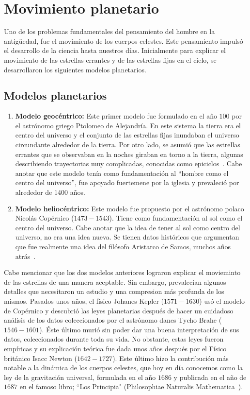\section{Movimiento planetario}

Uno de los problemas fundamentales del pensamiento del hombre en la antigüedad, fue el movimiento de los cuerpos celestes. Este pensamiento impulsó el desarrollo de la ciencia hasta nuestros días. Inicialmente para explicar el movimiento de las estrellas errantes y de las estrellas fijas en el cielo, se desarrollaron los siguientes modelos planetarios. 

\subsection{Modelos planetarios}

\begin{enumerate}
\item \textbf{Modelo geocéntrico:} Este primer modelo fue formulado en el año $100$ por el astrónomo griego Ptolomeo de Alejandría. En este sistema la tierra era el centro del universo y el conjunto de las estrellas fijas inundaban el universo circundante alrededor de la tierra. Por otro lado, se asumió que las estrellas errantes que se observaban en la noches giraban en torno a la tierra, algunas describiendo trayectorias muy complicadas, conocidas como epiciclos~\cite{alonso-z}. Cabe anotar que este modelo tenía como fundamentación al ``hombre como el centro del universo'', fue apoyado fuertemene por la iglesia y prevaleció por alrededor de 1400 años.

\item \textbf{Modelo heliocéntrico:} Este modelo fue propuesto por el astrónomo polaco Nicolás Copérnico ($1473-1543$). Tiene como fundamentación al sol como el centro del universo.
Cabe anotar que la idea de tener al sol como centro del universo, no era una idea nueva. Se tienen datos históricos que argumentan que fue realmente una idea del filósofo Aristarco de Samos, muchos años atrás~\cite{alonso-z}.
\end{enumerate}

Cabe mencionar que los dos modelos anteriores lograron explicar el movieminto de las estrellas de una manera aceptable. Sin embargo, prevalecian algunos detalles que necesitaron un estudio y una compresion más profunda de los mismos. Pasados unos años, el físico Johanes Kepler ($1571-1630$) usó el modelo de Copérnico y descubrió las leyes planetarias después de hacer un cuidadoso análisis de los datos coleccionados por el astrónomo danes Tycho Brahe ($1546-1601$). Éste último murió sin poder dar una buena interpretación de sus datos, coleccionados durante toda su vida.
No obstante, estas leyes fueron empíricas y su explicación teórica fue dada unos años después por el Físico británico Isacc Newton ($1642-1727$). Este último hizo la contribución más notable a la dinámica de los cuerpos celestes, que hoy en día conocemos como la ley de la gravitación universal, formulada en el año $1686$ y publicada en el año de $1687$ en el famoso libro; ``Los Principia" (Philosophiae Naturalis Mathematica~\cite{Whitehead:268025}).



